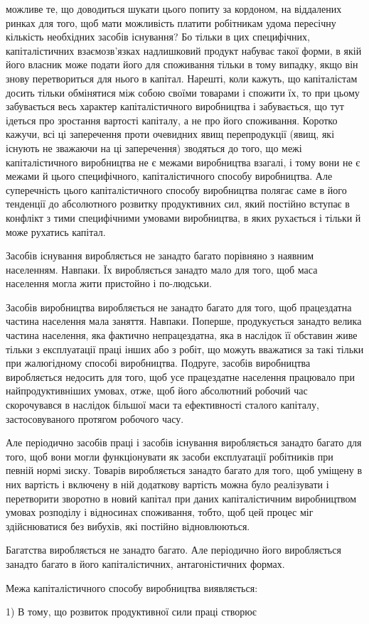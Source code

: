 \parcont{}  %
можливе те, що доводиться шукати цього попиту за кордоном, на
віддалених ринках для того, щоб мати можливість платити робітникам
удома пересічну кількість необхідних засобів існування? Бо
тільки в цих специфічних, капіталістичних взаємозв’язках надлишковий
продукт набуває такої форми, в якій його власник
може подати його для споживання тільки в тому випадку, якщо
він знову перетвориться для нього в капітал. Нарешті, коли
кажуть, що капіталістам досить тільки обмінятися між собою
своїми товарами і спожити їх, то при цьому забувається весь
характер капіталістичного виробництва і забувається, що тут
ідеться про зростання вартості капіталу, а не про його споживання.
Коротко кажучи, всі ці заперечення проти очевидних явищ
перепродукції (явищ, які існують не зважаючи на ці заперечення)
зводяться до того, що межі капіталістичного виробництва не
є межами виробництва взагалі, і тому вони не є межами й цього
специфічного, капіталістичного способу виробництва. Але суперечність
цього капіталістичного способу виробництва полягає
саме в його тенденції до абсолютного розвитку продуктивних сил,
який постійно вступає в конфлікт з тими специфічними умовами
виробництва, в яких рухається і тільки й може рухатись капітал.

Засобів існування виробляється не занадто багато порівняно
з наявним населенням. Навпаки. Їх виробляється занадто мало
для того, щоб маса населення могла жити пристойно і по-людськи.

Засобів виробництва виробляється не занадто багато для
того, щоб працездатна частина населення мала заняття. Навпаки.
Поперше, продукується занадто велика частина населення, яка
фактично непрацездатна, яка в наслідок її обставин живе тільки
з експлуатації праці інших або з робіт, що можуть вважатися
за такі тільки при жалюгідному способі виробництва. Подруге,
засобів виробництва виробляється недосить для того, щоб усе
працездатне населення працювало при найпродуктивніших умовах,
отже, щоб його абсолютний робочий час скорочувався
в наслідок більшої маси та ефективності сталого капіталу, застосовуваного
протягом робочого часу.

Але періодично засобів праці і засобів існування виробляється
занадто багато для того, щоб вони могли функціонувати
як засоби експлуатації робітників при певній нормі зиску. Товарів
виробляється занадто багато для того, щоб уміщену в них
вартість і включену в ній додаткову вартість можна було реалізувати
і перетворити зворотно в новий капітал при даних капіталістичним
виробництвом умовах розподілу і відносинах споживання,
тобто, щоб цей процес міг здійснюватися без вибухів,
які постійно відновлюються.

Багатства виробляється не занадто багато. Але періодично
його виробляється занадто багато в його капіталістичних, антагоністичних
формах.

Межа капіталістичного способу виробництва виявляється:

1) В тому, що розвиток продуктивної сили праці створює
\parbreak{}  %
